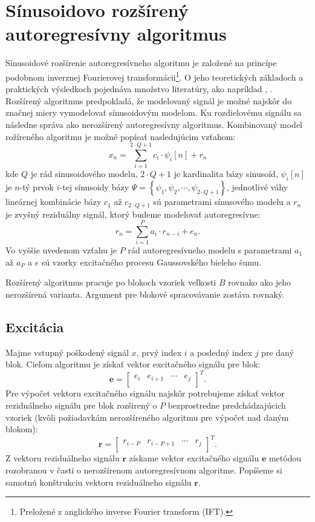 \section{Sínusoidovo rozšírený autoregresívny algoritmus}
Sínusoidové rozšírenie autoregresívneho algoritmu je založené na princípe podobnom inverznej Fourierovej transformácii\footnote{Preložené z anglického inverse Fourier transform (IFT).}. O jeho teoretických základoch a praktických výsledkoch pojednáva množstvo literatúry, ako napríklad \cite{Godsill}, \cite{Alvarez}. Rozšírený algoritmus predpokladá, že modelovaný signál je možné najskôr do značnej miery vymodelovať sínusoidovým modelom. Ku rozdielovému signálu sa následne správa ako nerozšírený autoregresívny algoritmus. Kombinovaný model rožíreného algoritmu je možné popísať nasledujúcim vzťahom:
$$x_n = \sum_{i=1}^{2 \cdot Q  + 1}c_i \cdot \psi_i[n] + r_n$$
kde $Q$ je rád sinusoidového modelu, $2 \cdot Q +1$ je kardinalita bázy sinusoíd, $\psi_i[n]$ je $n$-tý prvok $i$-tej sínusoidy bázy $\Psi = \left\{ \psi_1, \psi_2, \cdots, \psi_{2 \cdot Q  + 1} \right\}$, jednotlivé váhy lineárnej kombinácie bázy $c_1$ až $c_{2 \cdot Q  + 1}$ sú parametrami sínusového modelu a $r_n$ je zvyšný reziduálny signál, ktorý budeme modelovať autoregresívne: 
$$r_n = \sum_{i=1}^P a_i \cdot r_{n-i}+e_n.$$
Vo vyššie uvedenom vzťahu je $P$ rád autoregresívneho modelu s parametrami $a_1$ až $a_P$ a $e$ sú vzorky excitačného procesu Gaussovského bieleho šumu. 

Rozšírený algoritmus pracuje po blokoch vzoriek veľkosti $B$ rovnako ako jeho nerozšírená varianta. Argument pre blokové spracovávanie zostáva rovnaký.

\subsection{Excitácia}
Majme vstupný poškodený signál $x$, prvý index $i$ a posledný index $j$ pre daný blok. Cieľom algoritmu je získať vektor excitačného signálu pre blok:
$$\mathbf{e}=\begin{bmatrix} 
  e_i & e_{i+1} & \cdots & e_{j}\\
\end{bmatrix}^T.$$ 
Pre výpočet vektoru excitačného signálu najskôr potrebujeme získať vektor reziduálneho signálu pre blok rozširený o $P$ bezprostredne predchádzajúcich vzoriek (kvôli požiadavkám nerozšíreného algoritmu pre výpočet nad daným blokom): 
$$\mathbf{r} =\begin{bmatrix} 
  r_{i-P} & r_{i-P+1} & \cdots & r_{j}\\ 
\end{bmatrix}^T.$$
Z vektoru reziduálneho signálu $\mathbf{r}$ získame vektor excitačného signálu $\mathbf{e}$ metódou rozobranou v časti o nerozšírenom autoregresívnom algoritme. Popíšeme si samotnú konštrukciu vektoru reziduálneho signálu $\mathbf{r}$. 

